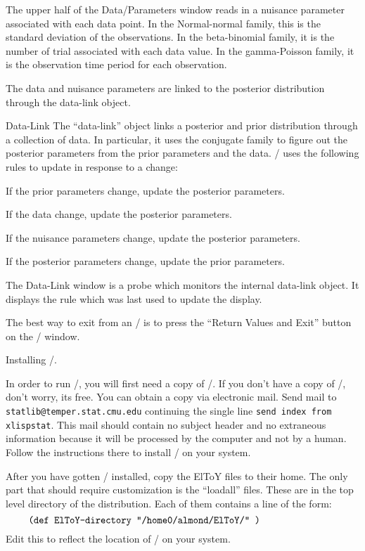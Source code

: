 \item{}  The upper half of the Data/Parameters window reads in a nuisance
parameter associated with each data point.  In the Normal-normal
family, this is the standard deviation of the observations.  In the
beta-binomial family, it is the number of trial associated with each data
value.  In the gamma-Poisson family, it is the observation time period
for each observation.

\item{} The data and nuisance parameters are linked to the posterior
distribution through the data-link object.

\item{Data-Link} The ``data-link'' object links a posterior and prior
distribution through a collection of data.  In particular, it uses the
conjugate family to figure out the posterior parameters from the prior
parameters and the data.  \eltoy/ uses the following rules to update
in response to a change:

 If the prior parameters change, update the posterior
parameters.

 If the data change, update the posterior parameters.

 If the nuisance parameters change, update the posterior
parameters. 

 If the posterior parameters change, update the prior
parameters.  

The Data-Link window is a probe which monitors the internal data-link
object.  It displays the rule which was last used to update the
display.

\medskip

The best way to exit from an \eltoy/ is to press the ``Return Values
and Exit'' button on the \eltoy/ window.

 Installing \eltoy/.


In order to run \eltoy/, you will first need a copy of \xlispstat/.  If
you don't have a copy of \xlispstat/, don't worry, its free.  You can
obtain a copy via electronic mail.  Send mail to {\tt
statlib@temper.stat.cmu.edu\/} continuing the single line {\tt send
index from xlispstat\/}.  This mail should contain no subject header
and no extraneous information because it will be processed by the
computer and not by a human.  Follow the instructions there to install
\xlispstat/ on your system.

After you have gotten \xlispstat/ installed, copy the ElToY files to
their home.  The only part that should require customization is the
``loadall'' files.  These are in the top level directory of the
distribution.   Each of them contains a line of the form:
$$\vbox{
\tt\obeyspaces
(def ElToY-directory "/home0/almond/ElToY/" )
}$$
Edit this to reflect the location of \eltoy/ on your system.

